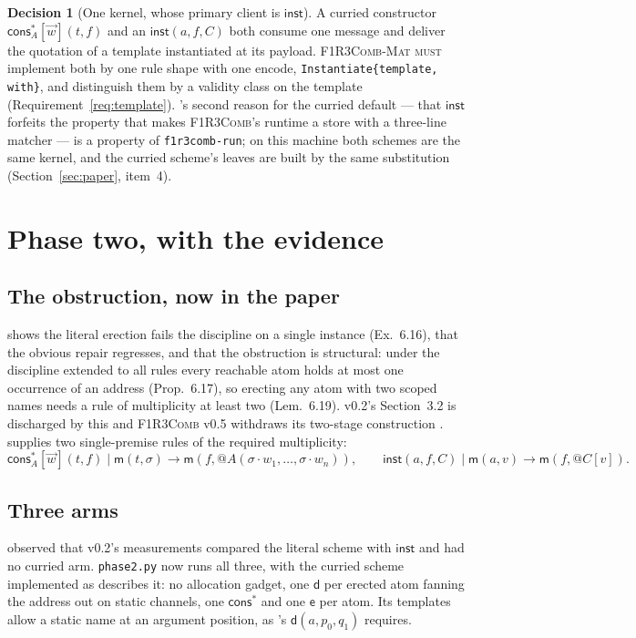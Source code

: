 \documentclass[11pt,a4paper]{article}
\makeatletter
\newcommand{\code}[1]{\texttt{#1}}
\newcommand{\Comb}{\textsc{F1R3Comb}}
\newcommand{\Mat}{\textsc{F1R3Comb-Mat}}
\newcommand{\MUST}{\textsc{must}}
\newcommand{\quo}[1]{@#1}
\newcommand{\red}{\longrightarrow}
\newcommand{\mm}{\mathsf{m}}
\newcommand{\dd}{\mathsf{d}}
\newcommand{\ev}{\mathsf{e}}
\theoremstyle{definition}
\newtheorem{decision}[definition]{Decision}
\theoremstyle{plain}
\newcommand{\inst}{\mathsf{inst}}
\newcommand{\cstar}{\mathsf{cons}^{*}}
\makeatother
\begin{document}
\begin{decision}[One kernel, whose primary client is $\inst$]
\label{dec:onekernel}
A curried constructor $\cstar_{A}[\vec w](t,f)$ and an $\inst(a,f,C)$ both
consume one message and deliver the quotation of a template instantiated at
its payload. \Mat{} \MUST{} implement both by one rule shape with one encode,
\code{Instantiate\{template, with\}}, and distinguish them by a validity class
on the template (Requirement~\ref{req:template}). \cite[Rem.~5.22]{combspec}'s
second reason for the curried default --- that $\inst$ forfeits the property
that makes \Comb's runtime a store with a three-line matcher --- is a property
of \code{f1r3comb-run}; on this machine both schemes are the same kernel, and
the curried scheme's leaves are built by the same substitution
(Section~\ref{sec:paper}, item~4).
\end{decision}

\section{Phase two, with the evidence}\label{sec:evidence}

\subsection{The obstruction, now in the paper}

\cite[\S6.6]{draft3} shows the literal erection fails the discipline on a
single instance (Ex.~6.16), that the obvious repair regresses, and that the
obstruction is structural: under the discipline extended to all rules every
reachable atom holds at most one occurrence of an address
(Prop.~6.17), so erecting any atom with two scoped names needs a rule of
multiplicity at least two (Lem.~6.19). v0.2's Section~3.2 is discharged by
this and \Comb{} v0.5 withdraws its two-stage construction
\cite[Rem.~5.16]{combspec}. \cite[\S6.7]{draft3} supplies two single-premise
rules of the required multiplicity:
\[
  \cstar_{A}[\vec w](t,f) \mid \mm(t,\sigma) \red
  \mm(f,\quo{A(\sigma\!\cdot\!w_{1},\dots,\sigma\!\cdot\!w_{n})}),
  \qquad
  \inst(a,f,C) \mid \mm(a,v) \red \mm(f,\quo{C[v]}).
\]

\subsection{Three arms}

\cite[Rem.~5.20]{combspec} observed that v0.2's measurements compared the
literal scheme with $\inst$ and had no curried arm. \code{phase2.py} now runs
all three, with the curried scheme implemented as \cite[Rem.~5.21]{combspec}
describes it: no allocation gadget, one $\dd$ per erected atom fanning the
address out on static channels, one $\cstar$ and one $\ev$ per atom. Its
templates allow a static name at an argument position, as
\cite[Ex.~6.16]{draft3}'s $\dd(a,p_{0},q_{1})$ requires.
\end{document}
